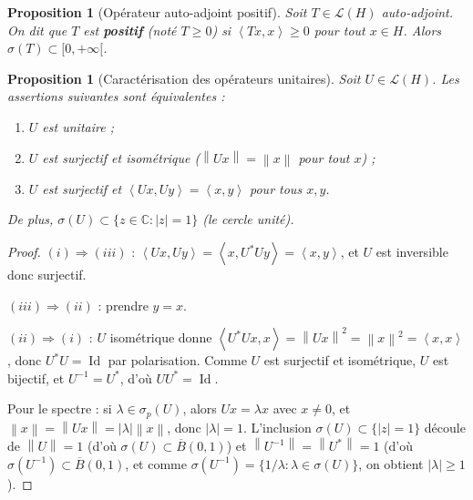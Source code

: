 \documentclass[a4paper,12pt]{book}
\DeclareMathOperator{\Id}{Id}
\newcommand{\C}{\mathbb{C}}
\newcommand{\norm}[1]{\left\| #1 \right\|}
\newcommand{\abs}[1]{\left| #1 \right|}
\newcommand{\inner}[2]{\left\langle #1, #2 \right\rangle}
\theoremstyle{definition}
\theoremstyle{plain}
\newtheorem{proposition}[definition]{Proposition}
\theoremstyle{remark}
\begin{document}
\begin{proposition}[Opérateur auto-adjoint positif]\label{prop:operateur-positif}
Soit $T \in \mathcal{L}(H)$ auto-adjoint. On dit que $T$ est \textbf{positif}
(noté $T \geq 0$) si $\inner{Tx}{x} \geq 0$ pour tout $x \in H$.
Alors $\sigma(T) \subset [0, +\infty[$.
\end{proposition}

\begin{proposition}[Caractérisation des opérateurs unitaires]\label{prop:caract-unitaire}
Soit $U \in \mathcal{L}(H)$. Les assertions suivantes sont équivalentes :
\begin{enumerate}[label=(\roman*)]
    \item $U$ est unitaire ;
    \item $U$ est surjectif et isométrique ($\norm{Ux} = \norm{x}$ pour tout $x$) ;
    \item $U$ est surjectif et $\inner{Ux}{Uy} = \inner{x}{y}$ pour tous $x, y$.
\end{enumerate}
De plus, $\sigma(U) \subset \{z \in \C : \abs{z} = 1\}$ (le cercle unité).
\end{proposition}

\begin{proof}
$(i) \Rightarrow (iii)$ : $\inner{Ux}{Uy} = \inner{x}{U^*Uy} = \inner{x}{y}$, et $U$
est inversible donc surjectif.

$(iii) \Rightarrow (ii)$ : prendre $y = x$.

$(ii) \Rightarrow (i)$ : $U$ isométrique donne $\inner{U^*Ux}{x} = \norm{Ux}^2 =
\norm{x}^2 = \inner{x}{x}$, donc $U^*U = \Id$ par polarisation.
Comme $U$ est surjectif et isométrique, $U$ est bijectif, et $U^{-1} = U^*$, d'où
$UU^* = \Id$.

Pour le spectre : si $\lambda \in \sigma_p(U)$, alors $Ux = \lambda x$ avec $x \neq 0$,
et $\norm{x} = \norm{Ux} = \abs{\lambda}\norm{x}$, donc $\abs{\lambda} = 1$.
L'inclusion $\sigma(U) \subset \{\abs{z}=1\}$ découle de $\norm{U} = 1$ (d'où
$\sigma(U) \subset \overline{B}(0,1)$) et $\norm{U^{-1}} = \norm{U^*} = 1$ (d'où
$\sigma(U^{-1}) \subset \overline{B}(0,1)$, et comme
$\sigma(U^{-1}) = \{1/\lambda : \lambda \in \sigma(U)\}$, on obtient $\abs{\lambda} \geq 1$).
\end{proof}


\end{document}

